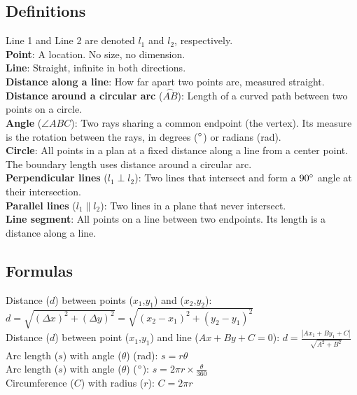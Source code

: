 \documentclass[12pt, oneside]{book}
\begin{document}
\subsection{Definitions}
Line 1 and Line 2 are denoted $l_1$ and $l_2$, respectively. \\
\textbf{Point}: A location. No size, no dimension.  \\
\textbf{Line}: Straight, infinite in both directions. \\
\textbf{Distance along a line}: How far apart two points are, measured straight. \\
\textbf{Distance around a circular arc} ($\overset{\frown}{AB}$): Length of a curved path between two points on a circle. \\
\textbf{Angle} ($\angle ABC$): Two rays sharing a common endpoint (the vertex). Its measure is the rotation between the rays, in degrees ($\degree$) or radians (rad). \\
\textbf{Circle}: All points in a plan at a fixed distance along a line from a center point. The boundary length uses distance around a circular arc. \\
\textbf{Perpendicular lines} ($l_1 \perp l_2$): Two lines that intersect and form a $90\degree$ angle at their intersection. \\
\textbf{Parallel lines} ($l_1 \parallel l_2$): Two lines in a plane that never intersect. \\
\textbf{Line segment}: All points on a line between two endpoints. Its length is a distance along a line. \\

\subsection{Formulas}
Distance ($d$) between points ($x_1$,$y_1$) and ($x_2$,$y_2$): $d = \sqrt{(\Delta x)^2 + (\Delta y)^2} = \sqrt{(x_2 - x_1)^2 + (y_2 - y_1)^2}$ \\
Distance ($d$) between point ($x_1$,$y_1$) and line ($Ax + By + C = 0$):  $d = \frac{ \left | Ax_1 + By_1 + C \right | }{\sqrt{A^2 + B^2}} $ \\
Arc length ($s$) with angle ($\theta$) (rad): $s = r \theta$ \\
Arc length ($s$) with angle ($\theta$) ($\degree$): $s = 2\pi r \times \frac{\theta}{360}$ \\
Circumference ($C$) with radius ($r$): $C = 2 \pi r$ \\
\end{document}
